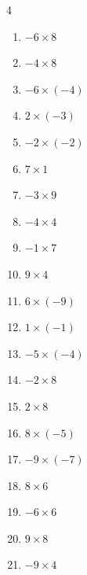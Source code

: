 \begin{multicols}{4}
\begin{enumerate}
  \item $-6\times 8$
        \phantom{$=-48$}

  \item $-4\times 8$
        \phantom{$=-32$}

  \item $-6\times (-4)$
        \phantom{$=24$}

  \item $2\times (-3)$
        \phantom{$=-6$}

  \item $-2\times (-2)$
        \phantom{$=4$}

  \item $7\times 1$
        \phantom{$=7$}

  \item $-3\times 9$
        \phantom{$=-27$}

  \item $-4\times 4$
        \phantom{$=-16$}

  \item $-1\times 7$
        \phantom{$=-7$}

  \item $9\times 4$
        \phantom{$=36$}

  \item $6\times (-9)$
        \phantom{$=-54$}

  \item $1\times (-1)$
        \phantom{$=-1$}

  \item $-5\times (-4)$
        \phantom{$=20$}

  \item $-2\times 8$
        \phantom{$=-16$}

  \item $2\times 8$
        \phantom{$=16$}

  \item $8\times (-5)$
        \phantom{$=-40$}

  \item $-9\times (-7)$
        \phantom{$=63$}

  \item $8\times 6$
        \phantom{$=48$}

  \item $-6\times 6$
        \phantom{$=-36$}

  \item $9\times 8$
        \phantom{$=72$}

  \item $-9\times 4$
        \phantom{$=-36$}


\end{enumerate}
\end{multicols}
